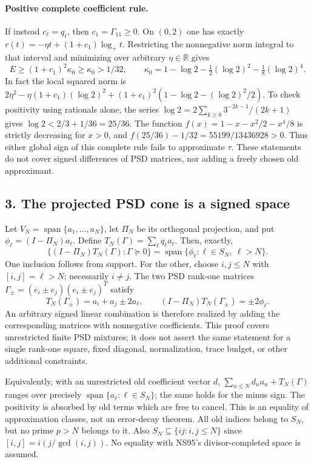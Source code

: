 \paragraph{Positive complete coefficient rule.}
If instead $c_\ell=q_\ell$, then $c_1=\Gamma_{11}\geq0$.
On $(0,2)$ one has exactly
$r(t)=-\eta t+(1+c_1)\log_+t$.
Restricting the nonnegative norm integral to that interval and minimizing
over arbitrary $\eta\in\mathbb R$ gives
\[
 E\geq(1+c_1)^2\kappa_0\geq\kappa_0>1/32,\qquad
 \kappa_0=1-\log2-\tfrac12(\log2)^2-\tfrac18(\log2)^4.
 \tag{96.8}
\]
In fact the local squared norm is
$2\eta^2-\eta(1+c_1)(\log2)^2+
(1+c_1)^2(1-\log2-(\log2)^2/2)$.
To check positivity using rationals alone, the series
$\log2=2\sum_{k\geq0}3^{-2k-1}/(2k+1)$ gives
$\log2<2/3+1/36=25/36$. The function
$f(x)=1-x-x^2/2-x^4/8$ is strictly decreasing for $x>0$, and
$f(25/36)-1/32=55199/13436928>0$.
Thus either global sign of this complete rule fails to approximate $\tau$.
These statements do not cover signed differences of PSD matrices, nor
adding a freely chosen old approximant.

\subsection*{3. The projected PSD cone is a signed space}
Let $V_N=\operatorname{span}\{a_1,\ldots,a_N\}$, let $\Pi_N$ be its
orthogonal projection, and put $\phi_\ell=(I-\Pi_N)a_\ell$.
Define $T_N(\Gamma)=\sum_\ell q_\ell a_\ell$. Then, exactly,
\[
 \boxed{\{(I-\Pi_N)T_N(\Gamma):\Gamma\succeq0\}
 =\operatorname{span}\{\phi_\ell:\ell\in S_N,\ \ell>N\}.}
 \tag{96.9}
\]
One inclusion follows from support. For the other, choose $i,j\leq N$
with $[i,j]=\ell>N$; necessarily $i\ne j$. The two PSD rank-one matrices
$\Gamma_\pm=(e_i\pm e_j)(e_i\pm e_j)^T$ satisfy
\[
 T_N(\Gamma_\pm)=a_i+a_j\pm2a_\ell,
 \qquad (I-\Pi_N)T_N(\Gamma_\pm)=\pm2\phi_\ell.
 \tag{96.10}
\]
An arbitrary signed linear combination is therefore realized by adding
the corresponding matrices with nonnegative coefficients. This proof
covers unrestricted finite PSD mixtures; it does not assert the same
statement for a single rank-one square, fixed diagonal, normalization,
trace budget, or other additional constraints.

Equivalently, with an unrestricted old coefficient vector $d$,
$\sum_{n\leq N}d_n a_n+T_N(\Gamma)$ ranges over precisely
$\operatorname{span}\{a_\ell:\ell\in S_N\}$; the same holds for the
minus sign. The positivity is absorbed by old terms which are free to
cancel. This is an equality of approximation classes, not an error-decay
theorem. All old indices belong to $S_N$, but no prime $p>N$ belongs to it.
Also $S_N\subseteq\{ij:i,j\leq N\}$ since
$[i,j]=i(j/\gcd(i,j))$. No equality with NS95's divisor-completed space
is assumed.

